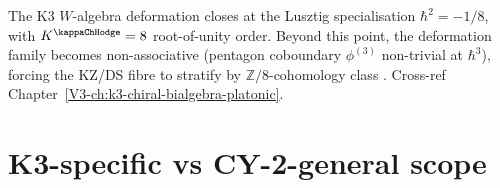 \begin{remark}
\label{rem:wac-2}
The K3 $W$-algebra deformation closes at the Lusztig specialisation
$\hbar^2 = -1/8$, with $K^{\kappaChHodge} = 8$ root-of-unity
order. Beyond this point, the deformation family becomes non-associative
(pentagon coboundary $\phi^{(3)}$ non-trivial at $\hbar^3$), forcing the
KZ/DS fibre to stratify by $\mathbb Z/8$-cohomology class
\cite{Lusztig1990,EtingofKazhdan2007PartV}. Cross-ref
Chapter~\ref{V3-ch:k3-chiral-bialgebra-platonic}.
\end{remark}

\section{K3-specific vs CY-2-general scope}
\label{sec:wac-supplement-ii}

